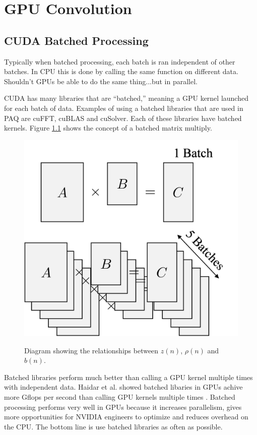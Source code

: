 \chapter{GPU Convolution}


\section{CUDA Batched Processing}
Typically when batched processing, each batch is ran independent of other batches.
In CPU this is done by calling the same function on different data.
Shouldn't GPUs be able to do the same thing...but in parallel.

CUDA has many libraries that are ``batched,'' meaning a GPU kernel launched for each batch of data.
Examples of using a batched libraries that are used in PAQ are cuFFT, cuBLAS and cuSolver.
Each of these libraries have batched kernels.
Figure \ref{fig:matrix_batch_vs_batched} shows the concept of a batched matrix multiply.
\begin{figure}
	\caption{Diagram showing the relationships between $z(n)$, $\rho(n)$ and $b(n)$.}
	\centering\includegraphics[width=4.13in/100*55]{figures/eq_GPUimplementation/matrix_batch_vs_batched.pdf}
	\label{fig:matrix_batch_vs_batched}
\end{figure}

Batched libraries perform much better than calling a GPU kernel multiple times with independent data.
Haidar et al. showed batched libaries in GPUs achive more Gflops per second than calling GPU kernels multiple times \cite{haidar2015optimization}.
Batched processing performs very well in GPUs because it increases parallelism, gives more opportunities for NVIDIA engineers to optimize and reduces overhead on the CPU.
The bottom line is use batched libraries as often as possible.

